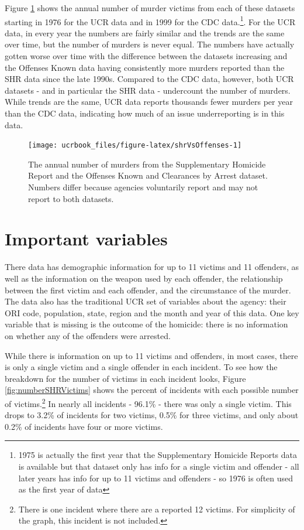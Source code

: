 \documentclass[
  12pt,
  openany]{book}
\begin{document}
Figure \ref{fig:shrVsOffenses} shows the annual number of murder victims from each of these datasets starting in 1976 for the UCR data and in 1999 for the CDC data.\footnote{1975 is actually the first year that the Supplementary Homicide Reports data is available but that dataset only has info for a single victim and offender - all later years has info for up to 11 victims and offenders - so 1976 is often used as the first year of data}. For the UCR data, in every year the numbers are fairly similar and the trends are the same over time, but the number of murders is never equal. The numbers have actually gotten worse over time with the difference between the datasets increasing and the Offenses Known data having consistently more murders reported than the SHR data since the late 1990s. Compared to the CDC data, however, both UCR datasets - and in particular the SHR data - undercount the number of murders. While trends are the same, UCR data reports thousands fewer murders per year than the CDC data, indicating how much of an issue underreporting is in this data.

\begin{figure}

{\centering \texttt{[image: ucrbook\_files/figure-latex/shrVsOffenses-1]} 

}

\caption{The annual number of murders from the Supplementary Homicide Report and the Offenses Known and Clearances by Arrest dataset. Numbers differ because agencies voluntarily report and may not report to both datasets.}\label{fig:shrVsOffenses}
\end{figure}

\hypertarget{important-variables-3}{%
\section{Important variables}\label{important-variables-3}}

There data has demographic information for up to 11 victims and 11 offenders, as well as the information on the weapon used by each offender, the relationship between the first victim and each offender, and the circumstance of the murder. The data also has the traditional UCR set of variables about the agency: their ORI code, population, state, region and the month and year of this data. One key variable that is missing is the outcome of the homicide: there is no information on whether any of the offenders were arrested.

While there is information on up to 11 victims and offenders, in most cases, there is only a single victim and a single offender in each incident. To see how the breakdown for the number of victims in each incident looks, Figure \ref{fig:numberSHRVictims} shows the percent of incidents with each possible number of victims.\footnote{There is one incident where there are a reported 12 victims. For simplicity of the graph, this incident is not included.} In nearly all incidents - 96.1\% - there was only a single victim. This drops to 3.2\% of incidents for two victims, 0.5\% for three victims, and only about 0.2\% of incidents have four or more victims.
\end{document}
